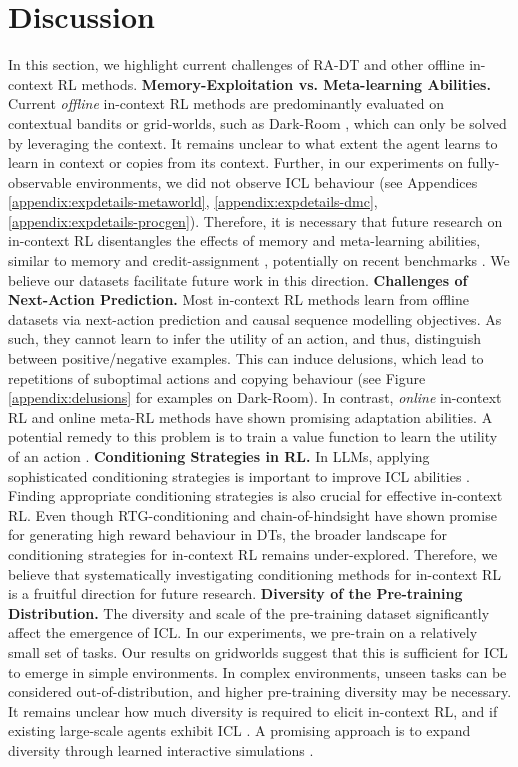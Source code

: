 \documentclass{article}
\begin{document}
\section{Discussion}\label{sec:discussion}
In this section, we highlight current challenges of RA-DT and other offline in-context RL methods.
\textbf{Memory-Exploitation vs. Meta-learning Abilities.}
Current \emph{offline} in-context RL methods are predominantly evaluated on contextual bandits or grid-worlds, such as Dark-Room \citep{Laskin:22,Lee:23,Lin:23,zisman2023emergence,Sinii:23,huang2024context}, which can only be solved by leveraging the context.
It remains unclear to what extent the agent learns to learn in context or copies from its context.
Further, in our experiments on fully-observable environments, we did not observe ICL behaviour (see Appendices \ref{appendix:expdetails-metaworld}, \ref{appendix:expdetails-dmc}, \ref{appendix:expdetails-procgen}).
Therefore, it is necessary that future research on in-context RL disentangles the effects of memory and meta-learning abilities, similar to memory and credit-assignment \citep{Ni:24}, potentially on recent benchmarks \citep{nikulin2023xland,nikulin2024xland}.
We believe our datasets facilitate future work in this direction.
\textbf{Challenges of Next-Action Prediction.}
Most in-context RL methods learn from offline datasets via next-action prediction and causal sequence modelling objectives.
As such, they cannot learn to infer the utility of an action, and thus, distinguish between positive/negative examples.
This can induce delusions, which lead to repetitions of suboptimal actions and copying behaviour \citep{Ortega:21} (see Figure \ref{appendix:delusions} for examples on Dark-Room).
In contrast, \emph{online} in-context RL \citep{AdA:23,Grigsby:23,Lu:24} and online meta-RL methods \citep{Melo:22,Shala:24} have shown promising adaptation abilities.
A potential remedy to this problem is to train a value function to learn the utility of an action \citep{Zanette:21,Kumar:2020}.
\textbf{Conditioning Strategies in RL.}
In LLMs, applying sophisticated conditioning strategies is important to improve ICL abilities \citep{Wei:22,Yao:24,Agarwal:24}.
Finding appropriate conditioning strategies is also crucial for effective in-context RL.
Even though RTG-conditioning \citep{Chen:21} and chain-of-hindsight \citep{Liu:23} have shown promise for generating high reward behaviour in DTs, the broader landscape for conditioning strategies for in-context RL remains under-explored.
Therefore, we believe that systematically investigating conditioning methods for in-context RL is a fruitful direction for future research.
\textbf{Diversity of the Pre-training Distribution.}
The diversity and scale of the pre-training dataset significantly affect the emergence of ICL.
In our experiments, we pre-train on a relatively small set of tasks.
Our results on gridworlds suggest that this is sufficient for ICL to emerge in simple environments.
In complex environments, unseen tasks can be considered out-of-distribution, and higher pre-training diversity may be necessary.
It remains unclear how much diversity is required to elicit in-context RL, and if existing large-scale agents exhibit ICL \citep{Reed:22,Raad:24}.
A promising approach is to expand diversity through learned interactive simulations \citep{Bruce:24}.
\end{document}
